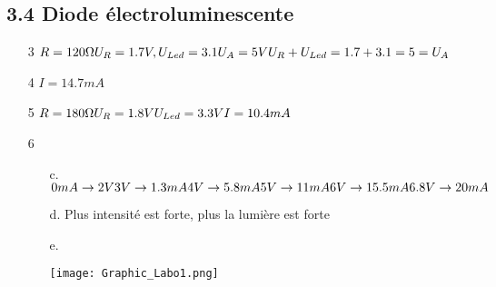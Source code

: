 \documentclass[a4paper, 12pt]{article}
\begin{document}
\subsection*{3.4 Diode électroluminescente}
\begin{enumerate}
    \item[3] $R = 120 \Omega \\ U_{R} = 1.7V, \\ U_{Led} = 3.1 \\ U_{A}=5V \\ U_{R} + U_{Led} = 1.7 + 3.1 = 5 = U_{A}$
    \item[4] $I = 14.7mA$  
    \item[5] $R = 180 \Omega \\ U_{R} = 1.8V \\ U_{Led} = 3.3V \\ I = 10.4mA$
    \item[6] \begin{itemize}
        \item[c.] $  0mA \rightarrow 2V \\ 3V \rightarrow 1.3mA \\ 4V \rightarrow 5.8mA \\ 5V \rightarrow 11mA \\ 6V \rightarrow 15.5mA \\ 6.8V \rightarrow 20mA$
        \item[d.] Plus intensité est forte, plus la lumière est forte 
        \item[e.]   \begin{minipage}{0.6\textwidth}
                            \texttt{[image: Graphic\_Labo1.png]}
                    \end{minipage}
    \end{itemize} 
\end{enumerate}
\end{document}
